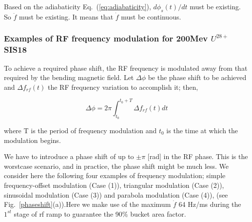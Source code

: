 Based on the adiabaticity Eq.~(\ref{eq:adiabaticity}), $d\phi_s(t)/ dt$ must be existing. So $\ddot f$ must be existing. It means that  $\dot f$  must be continuous.

\subsubsection{Examples of RF frequency modulation for 200Mev $U^{28+}$ SIS18}
To achieve a required phase shift, the RF frequency is modulated away from that required by the bending magnetic field. Let $\Delta \phi$ be the phase shift to be achieved and $\Delta f_{rf}(t)$ the RF frequency variation to accomplish it; then,

\begin{equation}
\Delta \phi=2\pi \int_{t_0}^{t_0+T} \Delta f_{rf}(t)dt 
\label{eq:phaseshift}
\end{equation}

where T is the period of frequency modulation and $t_0$ is the time at which the modulation begins.

We have to introduce a phase shift of up to $\pm \pi$  [rad] in the RF phase. This is the worstcase scenario, and in practice, the phase shift might be much less.
We consider here the following four examples of frequency modulation; simple frequency-offset modulation (Case (1)), triangular modulation (Case (2)), sinusoidal modulation (Case (3)) and parabola modulation (Case (4)), (see Fig.~\ref{phaseshift}(a)).Here we make use of the maximum $\dot f$ 64 Hz/ms during the $1^{st}$ stage of rf ramp to guarantee the 90$\%$ bucket area factor.

